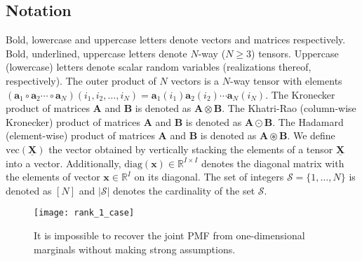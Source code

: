 \documentclass[journal]{IEEEtran}
\begin{document}
\subsection{Notation} 
Bold, lowercase and uppercase letters denote vectors and matrices respectively. Bold, underlined, uppercase letters denote $N$-way ($N \geq 3$) tensors. Uppercase (lowercase) letters denote scalar random variables (realizations thereof, respectively). The outer product of $N$ vectors is a $N$-way tensor with elements $(\mathbf{a}_1 \circ \mathbf{a}_2 \cdots \circ \mathbf{a}_N)(i_1,i_2,\ldots,i_N) = \mathbf{a}_1(i_1)\mathbf{a}_2(i_2)\cdots \mathbf{a}_N(i_N)$. The Kronecker product of matrices $\mathbf{A}$  and $\mathbf{B}$ is denoted as $\mathbf{A} \otimes \mathbf{B}$. The Khatri-Rao (column-wise Kronecker) product of matrices $\mathbf{A}$ and $\mathbf{B}$ is denoted as $\mathbf{A} \odot \mathbf{B}$. The Hadamard (element-wise) product of matrices $\mathbf{A}$ and $\mathbf{B}$ is denoted as  $\mathbf{A} \circledast \mathbf{B}$. We define $\text{vec}(\underline{\mathbf{X}})$ the vector obtained by vertically stacking the elements of a tensor $\underline{\mathbf{X}}$ into a vector. Additionally, $\textrm{diag}(\mathbf{x}) \in \mathbb{R}^{I \times I}$ denotes the diagonal matrix with the elements of vector $\mathbf{x}  \in \mathbb{R}^{I}$ on its diagonal. The set of integers $\mathcal{S} = \{1,\ldots,N\}$ is denoted as $[N]$ and $|\mathcal{S}|$ denotes the cardinality of the set $\mathcal{S}$.
\begin{figure}[t]
	\centering
	\texttt{[image: rank\_1\_case]}
	\caption{It is impossible to recover the joint PMF from {one-dimensional} marginals {without making strong assumptions}.}
	\label{fig:rank1}
\end{figure}
\end{document}
